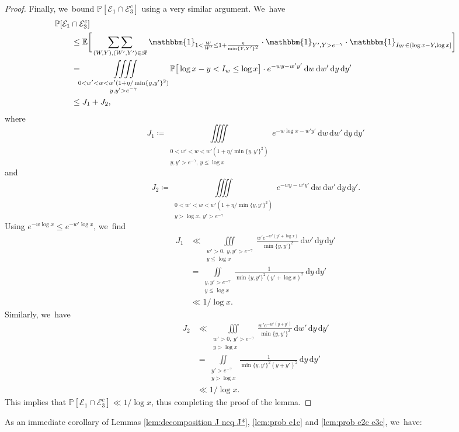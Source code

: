 \documentclass[JEP,XML,SOM,Unicode,published]{cedram}
\newcommand{\PP}{\mathbb{P}}
\newcommand{\EE}{\mathbb{E}}
\newcommand{\dee}{\,\mathrm{d}}
\newcommand{\one}{\mathbbm{1}}
\newcommand{\EC}{\mathcal{E}}
\newcommand{\RS}{\mathscr{R}}
\newcommand{\bg}{\big}
\newcommand{\bggg}{\bigg}
\theoremstyle{plain}
\theoremstyle{definition}
\begin{document}
\begin{proof}
Finally, we~bound $\PP[\EC_1 \cap \EC_3^c]$ using a very similar argument. We~have
\[
\begin{split}
&\PP[\EC_1 \cap \EC_3^c] \\
&\qquad \le
\EE\bggg[ \mathop{\sum\sum}_{(W,Y),(W',Y') \in\RS} \one_{1<\frac{W}{W'}\le 1+\frac{\eta}{\min\{Y,Y'\}^2}}\cdot\one_{Y',Y>e^{-\gamma}} \cdot \one_{I_W\in(\log x-Y,\log x]} \bggg] \\
&\qquad =
\iiiint\limits_{\substack{0 < w'<w < w'(1+\eta/\min\{y,y'\}^2)\\ y, y' > e^{-\gamma}}} \PP\bg[\log x - y<I_w \le \log x\bg]\cdot e^{-wy-w'y'}
\dee w\dee w'\dee y\dee y' \\
&\qquad \le J_1+J_2,
\end{split}
\]
where
\[
J_1 \coloneqq \iiiint\limits_{\substack{0 < w'<w < w'(1+\eta/\min\{y,y'\}^2)\\ y, y' > e^{-\gamma},\ y\le \log x}} e^{-w\log x-w'y'}
\dee w\dee w'\dee y\dee y'
\]
and
\[
J_2 \coloneqq \iiiint\limits_{\substack{0 < w'<w < w'(1+\eta/\min\{y,y'\}^2)\\ y>\log x,\ y' > e^{-\gamma}}} e^{-wy-w'y'}
\dee w\dee w'\dee y\dee y'.
\]
Using $e^{-w\log x}\le e^{-w'\log x}$, we~find
\begin{align*}
J_1&\ll \iiint\limits_{\substack{w'>0,\ y, y' > e^{-\gamma}\\ y\le \log x}} \frac{w'e^{-w'(y'+\log x)}}{\min\{y,y'\}^2} \dee w'\dee y\dee y' \\
&= \iint\limits_{\substack{y, y' > e^{-\gamma} \\ y\le \log x}} \frac{1}{\min\{y,y'\}^2(y'+\log x)^2} \dee y\dee y'\\
& \ll1/\log x.
\end{align*}
Similarly, we~have
\begin{align*}
J_2&\ll \iiint\limits_{\substack{w'>0,\ y' > e^{-\gamma}\\ y>\log x}} \frac{w'e^{-w'(y+y')} }{\min\{y,y'\}^2} \dee w'\dee y\dee y' \\
&= \iint\limits_{\substack{y' > e^{-\gamma} \\ y>\log x}} \frac{1}{\min\{y,y'\}^2(y+y')^2} \dee y\dee y'\\
& \ll1/\log x.
\end{align*}
This implies that $\PP[\EC_1\cap\EC_3^c]\ll 1/\log x$, thus completing the proof of the lemma.
\end{proof}

As an immediate corollary of Lemmas \ref{lem:decomposition J neq J*}, \ref{lem:prob e1c} and \ref{lem:prob e2c e3c}, we~have:
\end{document}
